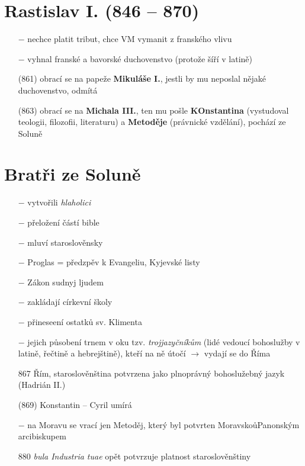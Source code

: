 \documentclass{article}
\begin{document}
\section*{Rastislav I. (846 -- 870)}
\begin{itemize}
    \vspace{-0.5em}
    \setlength\itemsep{0.15em}
    \item[$-$] nechce platit tribut, chce VM vymanit z franského vlivu
    \item[$-$] vyhnal franské a bavorské duchovenstvo (protože šíří v latině)
    \item[(861)] obrací se na papeže \textbf{Mikuláše I.}, jestli by mu neposlal nějaké duchovenstvo, odmítá
    \item[(863)] obrací se na \textbf{Michala III.}, ten mu pošle \textbf{KOnstantina} (vystudoval teologii, filozofii, literaturu) a \textbf{Metoděje} (právnické vzdělání), pochází ze Soluně
\end{itemize}

\section*{Bratři ze Soluně}
\begin{itemize}
    \vspace{-0.5em}
    \setlength\itemsep{0.15em}
    \item[$-$] vytvořili \textit{hlaholici}
    \item[$-$] přeložení částí bible
    \item[$-$] mluví staroslověnsky
    \item[$-$] Proglas = předzpěv k Evangeliu, Kyjevské listy
    \item[$-$] Zákon sudnyj ljudem
    \item[$-$] zakládají církevní školy
    \item[$-$] přineseení ostatků sv. Klimenta
    \item[$-$] jejich působení trnem v oku tzv. \textit{trojjazyčníkům} (lidé vedoucí bohoslužby v latině, řečtině a hebrejštině), kteří na ně útočí $\rightarrow$ vydají se do Říma
    \item[867] Řím, staroslověnština potvrzena jako plnoprávný bohoslužebný jazyk (Hadrián II.)
    \item[(869)] Konstantin -- Cyril umírá
    \item[$-$] na Moravu se vrací jen Metoděj, který byl potvrten MoravskoůPanonským arcibiskupem
    \item[880] \textit{bula Industria tuae} opět potvrzuje platnost staroslověnštiny
\end{itemize}
\end{document}
